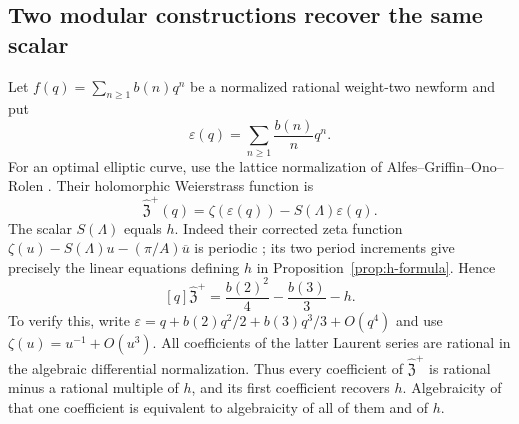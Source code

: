 \documentclass[11pt]{article}
\theoremstyle{definition}\newtheorem{definition}[theorem]{Definition}
\theoremstyle{remark}\newtheorem{remark}[theorem]{Remark}
\begin{document}
\subsection{Two modular constructions recover the same scalar}
Let $f(q)=\sum_{n\ge1}b(n)q^n$ be a normalized rational weight-two newform and put
\[
                 \varepsilon(q)=\sum_{n\ge1}\frac{b(n)}nq^n.
\]
For an optimal elliptic curve, use the lattice normalization of Alfes--Griffin--Ono--Rolen \cite[(1.4)--(1.8), p.~3]{AGOR}. Their holomorphic Weierstrass function is
\[
 \widehat{\mathfrak Z}^{+}(q)=\zeta(\varepsilon(q))-S(\Lambda)\varepsilon(q).
\]
The scalar $S(\Lambda)$ equals $h$. Indeed their corrected zeta function
$\zeta(u)-S(\Lambda)u-(\pi/A)\overline u$ is periodic \cite[(2.2), p.~9]{AGOR}; its two period increments give precisely the linear equations defining $h$ in Proposition~\ref{prop:h-formula}. Hence
\[
 [q]\widehat{\mathfrak Z}^{+}
             =\frac{b(2)^2}{4}-\frac{b(3)}3-h.
\]
To verify this, write $\varepsilon=q+b(2)q^2/2+b(3)q^3/3+O(q^4)$ and use $\zeta(u)=u^{-1}+O(u^3)$. All coefficients of the latter Laurent series are rational in the algebraic differential normalization. Thus every coefficient of $\widehat{\mathfrak Z}^{+}$ is rational minus a rational multiple of $h$, and its first coefficient recovers $h$. Algebraicity of that one coefficient is equivalent to algebraicity of all of them and of $h$.
\end{document}
